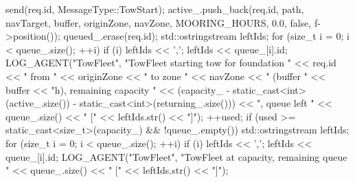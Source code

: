 \documentclass[10pt,letterpaper]{jsarticle}
\begin{document}
\begin{cppcode}
{{        send(req.id, MessageType::TowStart);
        active_.push_back({req.id, path, navTarget, buffer, originZone, navZone, MOORING_HOURS, 0.0, false, f->position()});
        queued_.erase(req.id);
        std::ostringstream leftIds;
        for (size_t i = 0; i < queue_.size(); ++i) {
            if (i) leftIds << ',';
            leftIds << queue_[i].id;
        }
        LOG_AGENT("TowFleet", "TowFleet starting tow for foundation " << req.id
                  << " from " << originZone << " to zone " << navZone
                  << " (buffer " << buffer << "h), remaining capacity "
                  << (capacity_ - static_cast<int>(active_.size())
                      - static_cast<int>(returning_.size()))
                  << ", queue left " << queue_.size() << " [" << leftIds.str() << "]");
        ++used;
    }
    if (used >= static_cast<size_t>(capacity_) && !queue_.empty()) {
        std::ostringstream leftIds;
        for (size_t i = 0; i < queue_.size(); ++i) {
            if (i) leftIds << ',';
            leftIds << queue_[i].id;
        }
        LOG_AGENT("TowFleet", "TowFleet at capacity, remaining queue " << queue_.size()
                  << " [" << leftIds.str() << "]");
    }

}
\end{cppcode}
\end{document}
